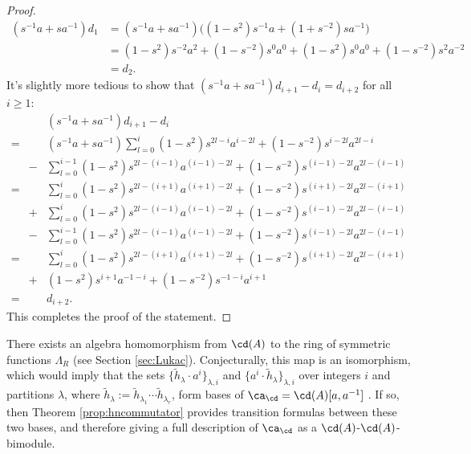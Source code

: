 \begin{proof}
\begin{align*}
( s^{-1} a + s a^{-1} ) d_1 &= ( s^{-1} a + s a^{-1} ) \big( ( 1 - s^2 ) s^{-1} a + ( 1 + s^{-2} ) s a^{-1} \big) \\
&= ( 1 - s^2 ) s^{-2} a^2 + (1 - s^{-2} ) s^0 a^0 + ( 1 - s^2 ) s^0 a^0 + ( 1 - s^{-2} ) s^2 a^{-2} \\
&= d_2.
\end{align*}
It's slightly more tedious to show that $( s^{-1} a + s a^{-1} ) d_{i+1} - d_i = d_{i+2}$ for all $i \geq 1$:
\begin{eqnarray*}
&&( s^{-1} a + s a^{-1} ) d_{i+1} - d_i \\
=&& ( s^{-1} a + s a^{-1} ) \sum_{l=0}^{i} (1 - s^2) s^{2l-i} a^{i-2l} + (1 - s^{-2}) s^{i-2l} a^{2l-i} \\
&-& \sum_{l=0}^{i-1} (1 - s^2) s^{2l-(i-1)} a^{(i-1)-2l} + (1 - s^{-2}) s^{(i-1)-2l} a^{2l-(i-1)} \\
=&& \sum_{l=0}^{i} (1 - s^2) s^{2l-(i+1)} a^{(i+1)-2l} + (1 - s^{-2}) s^{(i+1)-2l} a^{2l-(i+1)} \\
&+& \sum_{l=0}^{i} (1 - s^2) s^{2l-(i-1)} a^{(i-1)-2l} + (1 - s^{-2}) s^{(i-1)-2l} a^{2l-(i-1)} \\
&-& \sum_{l=0}^{i-1} (1 - s^2) s^{2l-(i-1)} a^{(i-1)-2l} + (1 - s^{-2}) s^{(i-1)-2l} a^{2l-(i-1)} \\
=&& \sum_{l=0}^{i} (1 - s^2) s^{2l-(i+1)} a^{(i+1)-2l} + (1 - s^{-2}) s^{(i+1)-2l} a^{2l-(i+1)} \\
&+& (1 - s^2) s^{i+1} a^{-1-i} + (1 - s^{-2}) s^{-1-i} a^{i+1} \\
=&& d_{i+2}.
\end{eqnarray*}
This completes the proof of the statement. 
\end{proof}

\begin{remark}
There exists an algebra homomorphism from $\cd(A)$ to the ring of symmetric functions $\Lambda_R$ (see Section \ref{sec:Lukac}). Conjecturally, this map is an isomorphism, which would imply that the sets $\{ \tilde{h}_\lambda \cdot a^i \}_{\lambda, i}$ and $\{ a^i \cdot \tilde{h}_\lambda \}_{\lambda, i}$ over integers $i$ and partitions $\lambda$, where $\tilde{h}_\lambda := \tilde{h}_{\lambda_1} \cdots \tilde{h}_{\lambda_r}$, form bases of $\ca_\cd = \cd(A)[a, a^{-1}]$ . If so, then Theorem \ref{prop:hncommutator} provides transition formulas between these two bases, and therefore giving a full description of $\ca_\cd$ as a $\cd(A)$-$\cd(A)$-bimodule. 
\end{remark}

